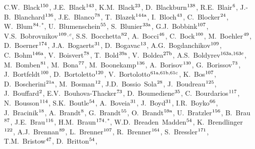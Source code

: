 \begin{flushleft}
C.W.~Black$^\textrm{\scriptsize 150}$,
J.E.~Black$^\textrm{\scriptsize 143}$,
K.M.~Black$^\textrm{\scriptsize 23}$,
D.~Blackburn$^\textrm{\scriptsize 138}$,
R.E.~Blair$^\textrm{\scriptsize 6}$,
J.-B.~Blanchard$^\textrm{\scriptsize 136}$,
J.E.~Blanco$^\textrm{\scriptsize 78}$,
T.~Blazek$^\textrm{\scriptsize 144a}$,
I.~Bloch$^\textrm{\scriptsize 43}$,
C.~Blocker$^\textrm{\scriptsize 24}$,
W.~Blum$^\textrm{\scriptsize 84}$$^{,*}$,
U.~Blumenschein$^\textrm{\scriptsize 55}$,
S.~Blunier$^\textrm{\scriptsize 33a}$,
G.J.~Bobbink$^\textrm{\scriptsize 107}$,
V.S.~Bobrovnikov$^\textrm{\scriptsize 109}$$^{,c}$,
S.S.~Bocchetta$^\textrm{\scriptsize 82}$,
A.~Bocci$^\textrm{\scriptsize 46}$,
C.~Bock$^\textrm{\scriptsize 100}$,
M.~Boehler$^\textrm{\scriptsize 49}$,
D.~Boerner$^\textrm{\scriptsize 174}$,
J.A.~Bogaerts$^\textrm{\scriptsize 31}$,
D.~Bogavac$^\textrm{\scriptsize 13}$,
A.G.~Bogdanchikov$^\textrm{\scriptsize 109}$,
C.~Bohm$^\textrm{\scriptsize 146a}$,
V.~Boisvert$^\textrm{\scriptsize 78}$,
T.~Bold$^\textrm{\scriptsize 39a}$,
V.~Boldea$^\textrm{\scriptsize 27b}$,
A.S.~Boldyrev$^\textrm{\scriptsize 163a,163c}$,
M.~Bomben$^\textrm{\scriptsize 81}$,
M.~Bona$^\textrm{\scriptsize 77}$,
M.~Boonekamp$^\textrm{\scriptsize 136}$,
A.~Borisov$^\textrm{\scriptsize 130}$,
G.~Borissov$^\textrm{\scriptsize 73}$,
J.~Bortfeldt$^\textrm{\scriptsize 100}$,
D.~Bortoletto$^\textrm{\scriptsize 120}$,
V.~Bortolotto$^\textrm{\scriptsize 61a,61b,61c}$,
K.~Bos$^\textrm{\scriptsize 107}$,
D.~Boscherini$^\textrm{\scriptsize 21a}$,
M.~Bosman$^\textrm{\scriptsize 12}$,
J.D.~Bossio~Sola$^\textrm{\scriptsize 28}$,
J.~Boudreau$^\textrm{\scriptsize 125}$,
J.~Bouffard$^\textrm{\scriptsize 2}$,
E.V.~Bouhova-Thacker$^\textrm{\scriptsize 73}$,
D.~Boumediene$^\textrm{\scriptsize 35}$,
C.~Bourdarios$^\textrm{\scriptsize 117}$,
N.~Bousson$^\textrm{\scriptsize 114}$,
S.K.~Boutle$^\textrm{\scriptsize 54}$,
A.~Boveia$^\textrm{\scriptsize 31}$,
J.~Boyd$^\textrm{\scriptsize 31}$,
I.R.~Boyko$^\textrm{\scriptsize 66}$,
J.~Bracinik$^\textrm{\scriptsize 18}$,
A.~Brandt$^\textrm{\scriptsize 8}$,
G.~Brandt$^\textrm{\scriptsize 55}$,
O.~Brandt$^\textrm{\scriptsize 59a}$,
U.~Bratzler$^\textrm{\scriptsize 156}$,
B.~Brau$^\textrm{\scriptsize 87}$,
J.E.~Brau$^\textrm{\scriptsize 116}$,
H.M.~Braun$^\textrm{\scriptsize 174}$$^{,*}$,
W.D.~Breaden~Madden$^\textrm{\scriptsize 54}$,
K.~Brendlinger$^\textrm{\scriptsize 122}$,
A.J.~Brennan$^\textrm{\scriptsize 89}$,
L.~Brenner$^\textrm{\scriptsize 107}$,
R.~Brenner$^\textrm{\scriptsize 164}$,
S.~Bressler$^\textrm{\scriptsize 171}$,
T.M.~Bristow$^\textrm{\scriptsize 47}$,
D.~Britton$^\textrm{\scriptsize 54}$,
$$
\end{flushleft}
